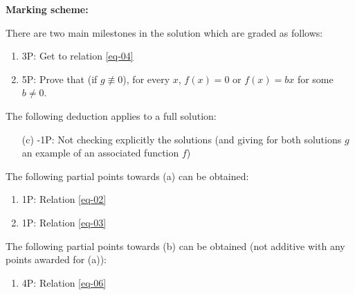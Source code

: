 {%

\textbf{Marking scheme:}

There are two main milestones in the solution which are graded as follows:

\begin{enumerate}
    \item 3P: Get to relation \eqref{eq-04}
    \item 5P: Prove that (if $g\nequiv 0$), for every $x$, $f(x)=0$ or $f(x)=bx$ for some $b\neq 0$.
\end{enumerate}

The following deduction applies to a full solution:

\begin{enumerate}
\item[(c)] -1P: Not checking explicitly the solutions (and giving for both solutions $g$ an example of an associated function $f$)
\end{enumerate}

The following partial points towards (a) can be obtained:

\begin{enumerate}[label=(a.\arabic*)]
    \item 1P: Relation \eqref{eq-02}
    \item 1P: Relation \eqref{eq-03}
\end{enumerate}

The following partial points towards (b) can be obtained (not additive with any points awarded for (a)):

\begin{enumerate}[label=(b.\arabic*)]
    \item 4P: Relation \eqref{eq-06}
\end{enumerate}
}
